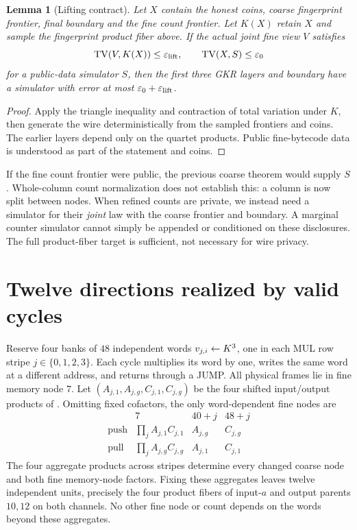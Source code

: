\documentclass[11pt]{article}
\newtheorem{lemma}{Lemma}
\begin{document}
\begin{lemma}[Lifting contract]
Let $X$ contain the honest coins, coarse fingerprint frontier, final boundary and the \emph{fine} count frontier. Let $K(X)$ retain $X$ and sample the fingerprint product fiber above. If the actual joint fine view $V$ satisfies
\[
 \operatorname{TV}(V,K(X))\le\varepsilon_{\rm lift},
 \qquad \operatorname{TV}(X,S)\le\varepsilon_0
\]
for a public-data simulator $S$, then the first three GKR layers and boundary have a simulator with error at most $\varepsilon_0+\varepsilon_{\rm lift}$.
\end{lemma}
\begin{proof}
Apply the triangle inequality and contraction of total variation under $K$, then generate the wire deterministically from the sampled frontiers and coins. The earlier layers depend only on the quartet products. Public fine-bytecode data is understood as part of the statement and coins.
\end{proof}

If the fine count frontier were public, the previous coarse theorem would supply $S$. Whole-column count normalization does not establish this: a column is now split between nodes. When refined counts are private, we instead need a simulator for their \emph{joint} law with the coarse frontier and boundary. A marginal counter simulator cannot simply be appended or conditioned on these disclosures. The full product-fiber target is sufficient, not necessary for wire privacy.

\section{Twelve directions realized by valid cycles}

Reserve four banks of $48$ independent words $v_{j,i}\gets K^3$, one in each MUL row stripe $j\in\{0,1,2,3\}$. Each cycle multiplies its word by one, writes the same word at a different address, and returns through a JUMP. All physical frames lie in fine memory node $7$. Let $(A_{j,1},A_{j,g},C_{j,1},C_{j,g})$ be the four shifted input/output products of . Omitting fixed cofactors, the only word-dependent fine nodes are
\[
\begin{array}{c|ccc}
 &7&40+j&48+j\\\hline
 \text{push}&\prod_j A_{j,1}C_{j,1}&A_{j,g}&C_{j,g}\\
 \text{pull}&\prod_j A_{j,g}C_{j,g}&A_{j,1}&C_{j,1}
\end{array}
\]
The four aggregate products across stripes determine every changed coarse node and both fine memory-node factors. Fixing these aggregates leaves twelve independent units, precisely the four product fibers of input-$a$ and output parents $10,12$ on both channels. No other fine node or count depends on the words beyond these aggregates.
\end{document}
